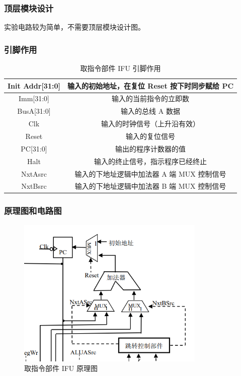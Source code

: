 \documentclass{article}
\begin{document}
    \subsubsection{顶层模块设计}
    实验电路较为简单，不需要顶层模块设计图。

    \subsubsection{引脚作用}
    \begin{table}[H]
    \centering
    \begin{tabular}{|c|c|}
        \hline
        Init Addr[31:0]   & 输入的初始地址，在复位 Reset 按下时同步赋给 PC \\ \hline
        Imm[31:0]    & 输入的当前指令的立即数 \\ \hline
        BusA[31:0]  & 输入的总线 A 数据 \\ \hline
        Clk  & 输入的时钟信号（上升沿有效） \\ \hline
        Reset  & 输入的复位信号 \\ \hline
        PC[31:0]  & 输出的程序计数器的值 \\ \hline
        Halt   & 输入的终止信号，指示程序已经终止 \\ \hline
        NxtAsrc  & 输入的下地址逻辑中加法器 A 端 MUX 控制信号 \\ \hline
        NxtBsrc  & 输入的下地址逻辑中加法器 B 端 MUX 控制信号 \\ \hline
    \end{tabular}
    \caption{取指令部件 IFU 引脚作用}
    \end{table}

    \subsubsection{原理图和电路图}

    \begin{figure}[H]
    \centering
    \includegraphics[width=0.8\textwidth]{3.4.1.png}
    \caption{取指令部件 IFU 原理图}
    \end{figure}
\end{document}
